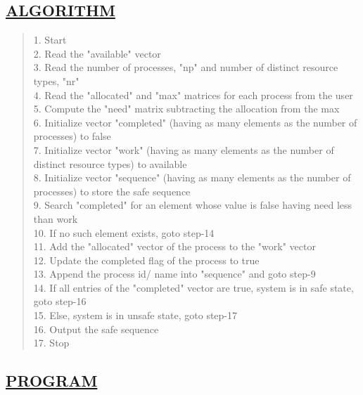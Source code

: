\documentclass[a4paper, 12pt]{article}
\begin{document}
\subsection*{\underline{ALGORITHM}}
\begin{quote}
1. Start\\
2. Read the "available" vector\\
3. Read the number of processes, "np" and number of distinct resource types, "nr"\\
4. Read the "allocated" and "max" matrices for each process from the user\\
5. Compute the "need" matrix subtracting the allocation from the max\\
6. Initialize vector "completed" (having as many elements as the number of processes) \hspace*{0.4cm} to false\\
7. Initialize vector "work" (having as many elements as the number of distinct resource \hspace*{0.4cm} types) to available\\
8. Initialize vector "sequence" (having as many elements as the number of processes) to \hspace*{0.4cm} store the safe sequence\\
9. Search "completed" for an element whose value is false having need less than work\\
10. If no such element exists, goto step-14\\
11. Add the "allocated" vector of the process to the "work" vector\\
12. Update the completed flag of the process to true\\
13. Append the process id/ name into "sequence" and goto step-9\\
14. If all entries of the "completed" vector are true, system is in safe state, goto step-16\\
15. Else, system is in unsafe state, goto step-17 \\
16. Output the safe sequence\\
17. Stop\\
\end{quote}

\subsection*{\underline{PROGRAM}}
\begin{quote}
\inputminted[fontsize=\small,breaklines,breakanywhere]{c}{bankers_algorithm.c}%
\end{quote}
\end{document}
